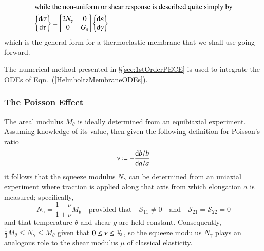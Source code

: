 \begin{subequations}
\begin{align}
    \label{HelmholtzMembraneODEsUniform}
    \intertext{while the non-uniform or shear response is described quite simply by}
    \left\{ \begin{matrix}
    \mathrm{d} \sigma \\ \mathrm{d} \tau
    \end{matrix} \right\} & = \begin{bmatrix}
    2 N_{\gamma} & 0 \\
    0 & G_{\varepsilon}
    \end{bmatrix} \left\{ \begin{matrix}
    \mathrm{d} \varepsilon \\ \mathrm{d} \gamma
    \end{matrix} \right\}
    \label{HelmholtzMembraneODEsNonUniform}
    \end{align}
\end{subequations}
which is the general form for a thermo\-elastic membrane that we shall use going forward. 

The numerical method presented in \S\ref{sec:1stOrderPECE} is used to integrate the ODEs of Eqn.~(\ref{HelmholtzMembraneODEs}).

\subsubsection{The Poisson Effect}

The areal modulus $M_{\theta}$ is ideally determined from an equibiaxial experiment.  Assuming knowledge of its value, then given the following definition for Poisson's ratio
\begin{displaymath}
\nu \defeq - \frac{\mathrm{d}b / b}{\mathrm{d}a / a}
\end{displaymath}
it follows that the squeeze modulus $N_{\gamma}$ can be determined from an uniaxial experiment where traction is applied along that axis from which elongation $a$ is measured; specifically,
\begin{displaymath}
N_{\gamma} = \frac{1 - \nu}{1 + \nu} M_{\theta}
\quad \text{provided that} \quad
\mathcal{S}_{11} \neq 0 
\quad \text{and} \quad
\mathcal{S}_{21} = \mathcal{S}_{22} = 0 
\end{displaymath}
and that temperature $\theta$ and shear $g$ are held constant.  Consequently, $\tfrac{1}{3} M_{\theta} \leq N_{\gamma} \leq M_{\theta}$ given that $0 \leq \nu \leq \textfrac{1}{2}$, so the squeeze modulus $N_{\gamma}$ plays an analogous role to the shear modulus $\mu$ of classical elasticity.  

